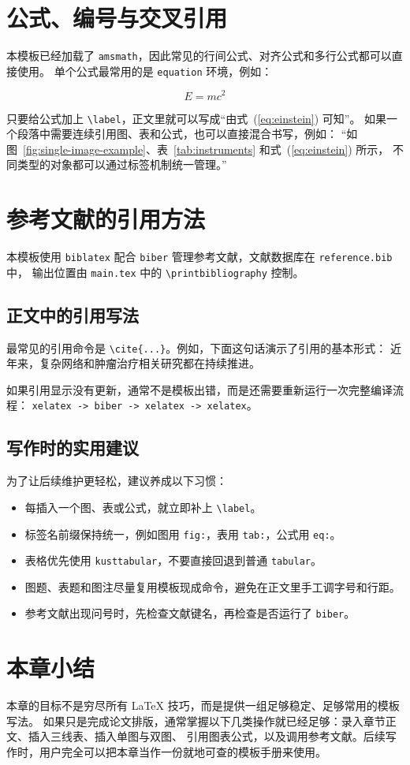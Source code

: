 \section{公式、编号与交叉引用}

本模板已经加载了 \verb|amsmath|，因此常见的行间公式、对齐公式和多行公式都可以直接使用。
单个公式最常用的是 \verb|equation| 环境，例如：

\begin{equation}
    E = mc^2
    \label{eq:einstein}
\end{equation}

只要给公式加上 \verb|\label|，正文里就可以写成“由式~(\ref{eq:einstein}) 可知”。
如果一个段落中需要连续引用图、表和公式，也可以直接混合书写，例如：
“如图~\ref{fig:single-image-example}、表~\ref{tab:instruments} 和式~(\ref{eq:einstein}) 所示，
不同类型的对象都可以通过标签机制统一管理。”

\section{参考文献的引用方法}

本模板使用 \verb|biblatex| 配合 \verb|biber| 管理参考文献，文献数据库在 \verb|reference.bib| 中，
输出位置由 \verb|main.tex| 中的 \verb|\printbibliography| 控制。

\subsection{正文中的引用写法}

最常见的引用命令是 \verb|\cite{...}|。例如，下面这句话演示了引用的基本形式：
近年来，复杂网络和肿瘤治疗相关研究都在持续推进\cite{mayWillLargeComplex1972,beltranNewTherapiesCastrationresistant2011}。

如果引用显示没有更新，通常不是模板出错，而是还需要重新运行一次完整编译流程：
\verb|xelatex -> biber -> xelatex -> xelatex|。

\subsection{写作时的实用建议}

为了让后续维护更轻松，建议养成以下习惯：

\begin{itemize}
    \item 每插入一个图、表或公式，就立即补上 \verb|\label|。
    \item 标签名前缀保持统一，例如图用 \verb|fig:|，表用 \verb|tab:|，公式用 \verb|eq:|。
    \item 表格优先使用 \verb|kusttabular|，不要直接回退到普通 \verb|tabular|。
    \item 图题、表题和图注尽量复用模板现成命令，避免在正文里手工调字号和行距。
    \item 参考文献出现问号时，先检查文献键名，再检查是否运行了 \verb|biber|。
\end{itemize}

\section{本章小结}

本章的目标不是穷尽所有 \LaTeX{} 技巧，而是提供一组足够稳定、足够常用的模板写法。
如果只是完成论文排版，通常掌握以下几类操作就已经足够：录入章节正文、插入三线表、插入单图与双图、
引用图表公式，以及调用参考文献。后续写作时，用户完全可以把本章当作一份就地可查的模板手册来使用。
